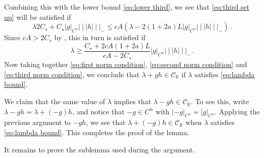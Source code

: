 \documentclass{amsart}
\numberwithin{equation}{section}
\newcommand\cC{{\mathcal C}}
\newcommand\bR{{\mathbb R}}
\newcommand{\tri}{{|\:\!\!|\:\!\!|}}
\begin{document}
Combining this with the lower bound \eqref{eq:lower third}, we see that \eqref{eq:third set up} will be satisfied
if
\[
\lambda 2 C_s + C_\star |g|_{C^\alpha} \tri h \tri_- 
\le cA (\lambda - 2(1+2a)L |g|_{C^\alpha} \tri h \tri_- ) \, .
\]
Since $cA > 2C_s$ by \cite[eq.~(5.36)]{DL22}, this in turn is satisfied if
\begin{equation}
\label{eq:third norm condition}
\lambda \ge \frac{C_\star + 2cA(1+2a)L}{cA - 2C_s} |g |_{C^\alpha} \tri h \tri_- \, .
\end{equation}
Now taking together \eqref{eq:first norm condition}, \eqref{eq:second norm condition} and
\eqref{eq:third norm condition}, we conclude that $\lambda + gh \in \cC_\bR$ if
$\lambda$ satisfies \eqref{eq:lambda bound}.

We claim that the same value of $\lambda$ implies that $\lambda - gh \in \cC_\bR$.  To see this, write
$\lambda - gh = \lambda + (-g)h$, and notice that $-g \in C^\alpha$ with $|-g|_{C^\alpha} = |g|_{C^\alpha}$.
Applying the previous argument to $-gh$, we see that $\lambda + (-g)h \in \cC_\bR$ when
$\lambda$ satisfies \eqref{eq:lambda bound}.  This completes the proof of the lemma.

It remains to prove the sublemma used during the argument.
\end{document}
